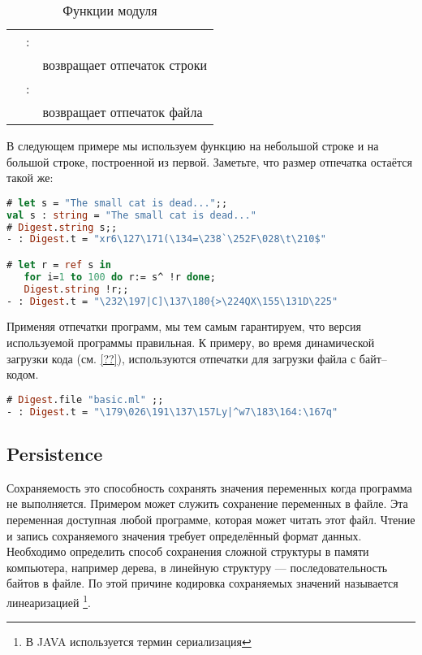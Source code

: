 \begin{table}[hl]
	\begin{center}
	\caption{\label{tbl:functions_of_the_digest_module} Функции модуля 
}
	\begin{tabular}{|l|c|l|}
		\hline
		\code{string} & : & \type{string -> t} \\
		& & возвращает отпечаток строки \\
		\hline
		\code{file} & : & \type{string -> t} \\
		& & возвращает отпечаток файла \\
		\hline
	\end{tabular}
	\end{center}
\end{table}

В следующем примере мы используем функцию  на небольшой строке и
на большой строке, построенной из первой. Заметьте, что размер отпечатка
остаётся такой же:

\begin{lstlisting}[language=OCaml]
# let s = "The small cat is dead...";;
val s : string = "The small cat is dead..."
# Digest.string s;;
- : Digest.t = "xr6\127\171(\134=\238`\252F\028\t\210$"

# let r = ref s in
   for i=1 to 100 do r:= s^ !r done;
   Digest.string !r;;
- : Digest.t = "\232\197|C]\137\180{>\224QX\155\131D\225"
\end{lstlisting}

Применяя отпечатки программ, мы тем самым гарантируем, что версия используемой 
программы правильная. К примеру, во время динамической загрузки кода (см. 
\ref{??}), используются отпечатки для загрузки файла с байт--кодом.

\begin{lstlisting}[language=OCaml]
# Digest.file "basic.ml" ;;
- : Digest.t = "\179\026\191\137\157Ly|^w7\183\164:\167q"
\end{lstlisting}

\subsection{Persistence}
\label{subsec:persistence}

Сохраняемость это способность сохранять значения переменных когда программа не 
выполняется. Примером может служить сохранение переменных в файле. Эта 
переменная доступная любой программе, которая может читать этот файл. Чтение и 
запись сохраняемого значения требует определённый формат данных. Необходимо 
определить способ сохранения сложной структуры в памяти компьютера, например 
дерева, в линейную структуру --- последовательность байтов в файле. По этой 
причине кодировка сохраняемых значений называется линеаризацией \footnote{В JAVA 
используется термин сериализация}.

